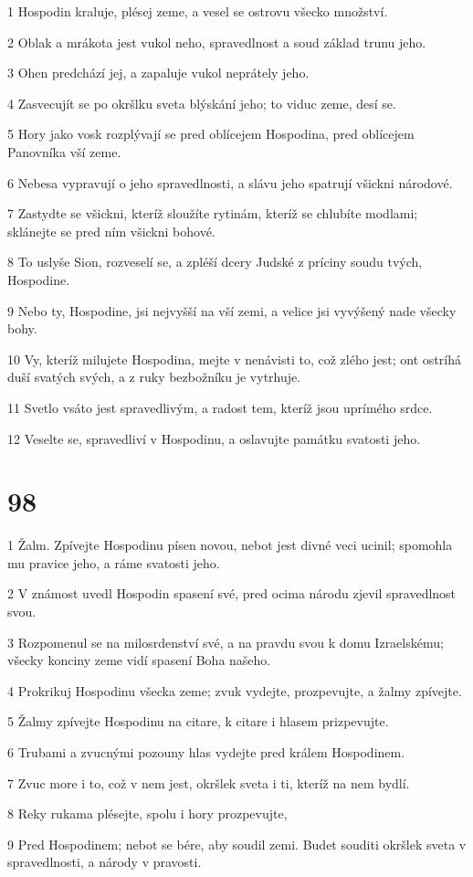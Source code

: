 \par 1 Hospodin kraluje, plésej zeme, a vesel se ostrovu všecko množství.
\par 2 Oblak a mrákota jest vukol neho, spravedlnost a soud základ trunu jeho.
\par 3 Ohen predchází jej, a zapaluje vukol neprátely jeho.
\par 4 Zasvecujít se po okršlku sveta blýskání jeho; to viduc zeme, desí se.
\par 5 Hory jako vosk rozplývají se pred oblícejem Hospodina, pred oblícejem Panovníka vší zeme.
\par 6 Nebesa vypravují o jeho spravedlnosti, a slávu jeho spatrují všickni národové.
\par 7 Zastydte se všickni, kteríž sloužíte rytinám, kteríž se chlubíte modlami; sklánejte se pred ním všickni bohové.
\par 8 To uslyše Sion, rozveselí se, a zpléší dcery Judské z príciny soudu tvých, Hospodine.
\par 9 Nebo ty, Hospodine, jsi nejvyšší na vší zemi, a velice jsi vyvýšený nade všecky bohy.
\par 10 Vy, kteríž milujete Hospodina, mejte v nenávisti to, což zlého jest; ont ostríhá duší svatých svých, a z ruky bezbožníku je vytrhuje.
\par 11 Svetlo vsáto jest spravedlivým, a radost tem, kteríž jsou uprímého srdce.
\par 12 Veselte se, spravedliví v Hospodinu, a oslavujte památku svatosti jeho.

\chapter{98}

\par 1 Žalm. Zpívejte Hospodinu písen novou, nebot jest divné veci ucinil; spomohla mu pravice jeho, a ráme svatosti jeho.
\par 2 V známost uvedl Hospodin spasení své, pred ocima národu zjevil spravedlnost svou.
\par 3 Rozpomenul se na milosrdenství své, a na pravdu svou k domu Izraelskému; všecky konciny zeme vidí spasení Boha našeho.
\par 4 Prokrikuj Hospodinu všecka zeme; zvuk vydejte, prozpevujte, a žalmy zpívejte.
\par 5 Žalmy zpívejte Hospodinu na citare, k citare i hlasem prizpevujte.
\par 6 Trubami a zvucnými pozouny hlas vydejte pred králem Hospodinem.
\par 7 Zvuc more i to, což v nem jest, okršlek sveta i ti, kteríž na nem bydlí.
\par 8 Reky rukama plésejte, spolu i hory prozpevujte,
\par 9 Pred Hospodinem; nebot se bére, aby soudil zemi. Budet souditi okršlek sveta v spravedlnosti, a národy v pravosti.

